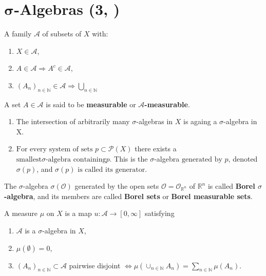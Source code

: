 \section{\underline{}\(\boldsymbol{\sigma}\)-Algebras \tiny{(3, \cite{schilling2017measures})}}
\begin{definition}
    A family \(\mathscr{A}\) of subsets of \(X\) with:
    \begin{enumerate}[label=(\roman*)]
        \item \(X\in\mathscr{A}\), \label{ax:sigma1}
        \item \(A\in\mathscr{A} \Rightarrow A^c \in\mathscr{A}\), \label{ax:sigma2}
        \item \(\left( A_n \right)_{n\in\mathbb{N}} \in\mathscr{A} \Rightarrow \bigcup\limits_{n\in\mathbb{N}} \)
    \end{enumerate}
    A set \(A\in\mathscr{A}\) is said to be \textbf{measurable} or \(\boldsymbol{\mathscr{A}}\)\textbf{-measurable}.
\end{definition}
\begin{theorem}
    \quad 

    \begin{enumerate}[label=(\roman*)]
        \item The intersection of arbitrarily many \(\sigma\)-algebras in \(X\) is againg a \(\sigma\)-algebra in X.
        \item \(\text{For every system of sets }p \subset \mathscr{P}(X)\) there exists a 
        \(\text{smallest} \sigma\text{-algebra containing} p. \) This is the \(\sigma\)-algebra
        \(\text{generated by } p\), denoted \(\sigma(p)\), and 
        \(\sigma(p) \text{ is called its generator}\).
    \end{enumerate}
\end{theorem}
\begin{definition}[Borel]
    The \(\sigma\)-algebra \(\sigma(\mathcal{O})\) generated by the open sets \(\mathcal{O} = \mathcal{O}_{\mathbb{R}^n}\) of $\mathbb{R}^n$
    is called \textbf{Borel $\sigma$-algebra}, and its members are called \textbf{Borel sets} or
    \textbf{Borel measurable sets}.
\end{definition}
\begin{definition}
    A measure \(\mu\) on \(X\) is a map \(u:\mathcal{A}\rightarrow [0,\infty]\) satisfying 
    \begin{enumerate}[label=(\roman*)]
        \item \(\mathcal{A}\) is a \(\sigma\)-algebra in \(X\),
        \item \(\mu(\emptyset)=0\),
        \item \((A_n)_{n\in\mathbb{N}}\subset \mathcal{A}\) pairwise disjoint \(\Longleftrightarrow \mu\left(\cup_{n\in\mathbb{N}} A_n\right) = \sum_{n\in\mathbb{N}}\mu(A_n)\).
    \end{enumerate}
\end{definition}
